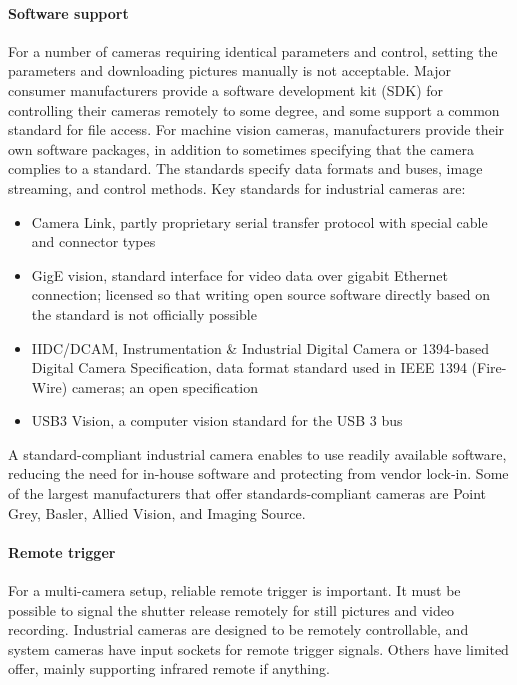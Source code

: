 
\paragraph{Software support}
For a number of cameras requiring identical parameters and control, setting the parameters and downloading pictures manually is not acceptable.
Major consumer manufacturers provide a software development kit (SDK) for controlling their cameras remotely to some degree, and some support a common standard for file access.
For machine vision cameras, manufacturers provide their own software packages, in addition to sometimes specifying that the camera complies to a standard.
The standards specify data formats and buses, image streaming, and control methods.
Key standards \cite{hornberg2007handbook,ni2013choosing} for industrial cameras are:

\begin{itemize}
	\item Camera Link, partly proprietary serial transfer protocol with special cable and connector types
	\item GigE vision, standard interface for video data over gigabit Ethernet connection; licensed so that writing open source software directly based on the standard is not officially possible
	\item IIDC/DCAM, Instrumentation \& Industrial Digital Camera or 1394-based Digital Camera Specification, data format standard used in IEEE 1394 (Fire-Wire) cameras; an open specification
	\item USB3 Vision, a computer vision standard for the USB 3 bus
\end{itemize}

A standard-compliant industrial camera enables to use readily available software, reducing the need for in-house software and protecting from vendor lock-in.
Some of the largest manufacturers that offer standards-compliant cameras are Point Grey, Basler, Allied Vision, and Imaging Source.



\paragraph{Remote trigger}
For a multi-camera setup, reliable remote trigger is important.
It must be possible to signal the shutter release remotely for still pictures and video recording.
Industrial cameras are designed to be remotely controllable, and system cameras have input sockets for remote trigger signals.
Others have limited offer, mainly supporting infrared remote if anything.

